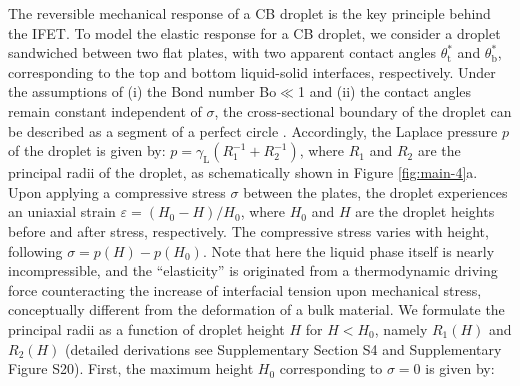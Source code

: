\documentclass[journal=nalefd,manuscript=letter,email=true,hyperref=true,keywords=true]{achemso}
\begin{document}
The reversible mechanical response of a CB droplet is the key
principle behind the IFET. To model the elastic response for a CB
droplet, we consider a droplet sandwiched between two flat plates,
with two apparent contact angles \(\theta_{\mathrm{t}}^{*}\) and
\(\theta_{\mathrm{b}}^{*}\), corresponding to the top and bottom
liquid-solid interfaces, respectively. Under the assumptions of (i)
the Bond number Bo\(\ll\)1 and (ii) the contact angles remain
constant independent of \(\sigma\), the cross-sectional boundary of
the droplet can be described as a segment of a perfect circle
\cite{berthier_2012_microdroplet}. Accordingly, the Laplace pressure
\(p\) of the droplet is given by: \(p = \gamma_{\mathrm{L}}
 (R_{1}^{-1} + R_{2}^{-1})\), where \(R_{1}\) and \(R_{2}\) are the
principal radii of the droplet, as schematically shown in Figure
\ref{fig:main-4}a. Upon applying a compressive stress \(\sigma\)
between the plates, the droplet experiences an uniaxial strain
\(\varepsilon = (H_{0} - H) / H_{0}\), where \(H_{0}\) and \(H\) are the droplet
heights before and after stress, respectively. The compressive stress
varies with height, following \(\sigma = p(H) - p(H_{0})\). Note
that here the liquid phase itself is nearly incompressible, and the
``elasticity'' is originated from a thermodynamic driving force
counteracting the increase of interfacial tension upon mechanical
stress, conceptually different from the deformation of a bulk
material. We formulate the principal radii as a function of droplet
height \(H\) for \(H < H_{0}\), namely \(R_{1}(H)\) and \(R_{2}(H)\)
(detailed derivations see Supplementary Section S4 and Supplementary
Figure S20). First, the maximum height \(H_{0}\) corresponding to \(\sigma=0\)
is given by:
\end{document}
